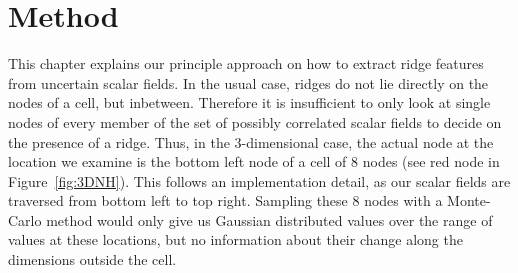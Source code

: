 \chapter{Method}\label{chap:Method}

This chapter explains our principle approach on how to extract ridge
features from uncertain scalar fields. In the usual case, ridges do not
lie directly on the nodes of a cell, but inbetween. Therefore it is
insufficient to only look at single nodes of every member of the set of
possibly correlated scalar fields to decide on the presence of a ridge.
Thus, in the $3$-dimensional case, the actual node at the location we
examine is the bottom left node of a cell of 8 nodes (see red node in
Figure~\ref{fig:3DNH}). This follows an implementation detail, as our
scalar fields are traversed from bottom left to top right. Sampling
these 8 nodes with a Monte-Carlo method would only give us Gaussian
distributed values over the range of values at these locations, but no
information about their change along the dimensions outside the cell.\\
